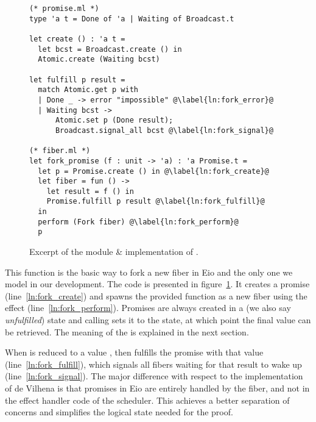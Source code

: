 \begin{figure}[ht]
    \begin{verbatim}
(* promise.ml *)
type 'a t = Done of 'a | Waiting of Broadcast.t

let create () : 'a t = 
  let bcst = Broadcast.create () in
  Atomic.create (Waiting bcst)

let fulfill p result =
  match Atomic.get p with
  | Done _ -> error "impossible" @\label{ln:fork_error}@
  | Waiting bcst ->
      Atomic.set p (Done result);
      Broadcast.signal_all bcst @\label{ln:fork_signal}@
  
(* fiber.ml *)
let fork_promise (f : unit -> 'a) : 'a Promise.t =
  let p = Promise.create () in @\label{ln:fork_create}@
  let fiber = fun () ->
    let result = f () in
    Promise.fulfill p result @\label{ln:fork_fulfill}@
  in
  perform (Fork fiber) @\label{ln:fork_perform}@
  p
  \end{verbatim}
    \caption{Excerpt of the  module \& implementation of .}
    \label{fig:sched-impl-fork}
\end{figure}

This function is the basic way to fork a new fiber in Eio and the only one we model in our development.
The code is presented in figure~\ref{fig:sched-impl-fork}.
It creates a promise (line~\ref{ln:fork_create}) and spawns the provided function as a new fiber using the \efork{} effect (line~\ref{ln:fork_perform}).
Promises are always created in a  (we also say \emph{unfulfilled}) state and calling  sets it to the  state, at which point the final value can be retrieved.
The meaning of the  is explained in the next section.

When  is reduced to a value ,  then fulfills the promise with that value (line~\ref{ln:fork_fulfill}), which signals all fibers waiting for that result to wake up (line~\ref{ln:fork_signal}).
The major difference with respect to the implementation of de Vilhena is that promises in Eio are entirely handled by the fiber, and not in the effect handler code of the scheduler.
This achieves a better separation of concerns and simplifies the logical state needed for the proof.

\subsubsection{}
\label{sec:sched-impl-await}

